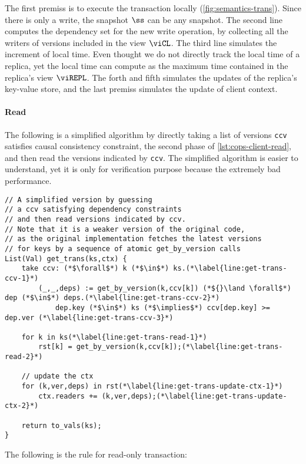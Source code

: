 The first premiss is to execute the transaction locally (\cref{fig:semantics-trans}).
Since there is only a write, the snapshot \( \ss \) can be any snapshot.
The second line computes the dependency set for the new write operation,
by collecting all the writers of versions included in the view \( \viCL \).
The third line simulates the increment of local time.
Even thought we do not directly track the local time of a replica, 
yet the local time can compute as the maximum time contained in the replica's view \( \viREPL \).
The forth and fifth simulates the updates of the replica's key-value store,
and the last premiss simulates the update of client context.

\paragraph{\bf Read}
The following is a simplified algorithm by directly taking a list of versions 
\verb|ccv| satisfies causal consistency constraint,
\ie the second phase of \cref{lst:cops-client-read},
and then read the versions indicated by \verb|ccv|.
The simplified algorithm is easier to understand,
yet it is only for verification purpose because the extremely bad performance.
\begin{lstlisting}[caption={get\_trans},label={lst:get-trans}]
// A simplified version by guessing
// a ccv satisfying dependency constraints
// and then read versions indicated by ccv.
// Note that it is a weaker version of the original code,
// as the original implementation fetches the latest versions
// for keys by a sequence of atomic get_by_version calls
List(Val) get_trans(ks,ctx) {
    take ccv: (*$\forall$*) k (*$\in$*) ks.(*\label{line:get-trans-ccv-1}*)
        (_,_,deps) := get_by_version(k,ccv[k]) (*${}\land \forall$*) dep (*$\in$*) deps.(*\label{line:get-trans-ccv-2}*)
            dep.key (*$\in$*) ks (*$\implies$*) ccv[dep.key] >= dep.ver (*\label{line:get-trans-ccv-3}*)

    for k in ks(*\label{line:get-trans-read-1}*)
        rst[k] = get_by_version(k,ccv[k]);(*\label{line:get-trans-read-2}*)

    // update the ctx
    for (k,ver,deps) in rst(*\label{line:get-trans-update-ctx-1}*)
        ctx.readers += (k,ver,deps);(*\label{line:get-trans-update-ctx-2}*)

    return to_vals(ks);
}                                   
\end{lstlisting}

The following is the rule for read-only transaction:

